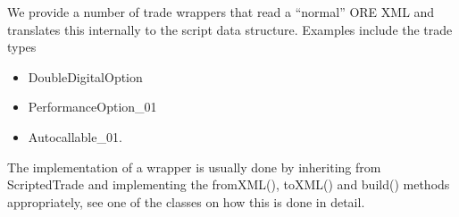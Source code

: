 We provide a number of trade wrappers that read a ``normal'' ORE XML and translates this internally to the script data
structure. Examples include the trade types

\begin{itemize}
\item DoubleDigitalOption
\item PerformanceOption\_01
\item Autocallable\_01.
\end{itemize}

The implementation of a wrapper is usually done by inheriting from ScriptedTrade and implementing the fromXML(), toXML()
and build() methods appropriately, see one of the classes on how this is done in detail.
